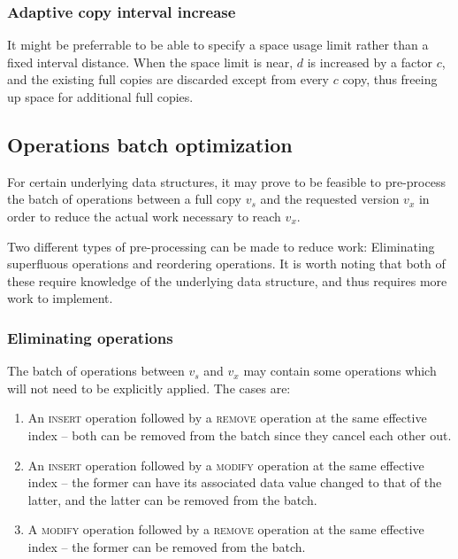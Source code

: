 \subsubsection{Adaptive copy interval increase}
It might be preferrable to be able to specify a space usage limit rather than a
fixed interval distance. When the space limit is near, $d$ is increased by a
factor $c$, and the existing full copies are discarded except from every $c$
copy, thus freeing up space for additional full copies.


\subsection{Operations batch optimization}
For certain underlying data structures, it may prove to be feasible to
pre-process the batch of operations between a full copy $v_s$ and the requested
version $v_x$ in order to reduce the actual work necessary to reach $v_x$.

Two different types of pre-processing can be made to reduce work: Eliminating
superfluous operations and reordering operations. It is worth noting that both
of these require knowledge of the underlying data structure, and thus requires
more work to implement.

\subsubsection{Eliminating operations}
The batch of operations between $v_s$ and $v_x$ may contain some operations
which will not need to be explicitly applied. The cases are:
\begin{enumerate}
  \item An \textsc{insert} operation followed by a \textsc{remove} operation at
  the same effective index -- both can be removed from the batch since they
  cancel each other out.
  \label{item:elop-insert-remove}

  \item An \textsc{insert} operation followed by a \textsc{modify} operation at
  the same effective index -- the former can have its associated data value
  changed to that of the latter, and the latter can be removed from the batch.
  \label{item:elop-insert-modify}

  \item A \textsc{modify} operation followed by a \textsc{remove} operation at
  the same effective index -- the former can be removed from the batch.
  \label{item:elop-modify-remove}
\end{enumerate}

